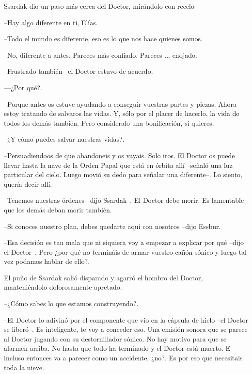 Ssardak dio un paso más cerca del Doctor, mirándolo con recelo


--Hay algo diferente en ti, Elías.



--Todo el mundo es diferente, eso es lo que nos hace quienes somos.



--No, diferente a antes. Pareces más confiado. Pareces ... enojado.



--Frustrado también --el Doctor estuvo de acuerdo.



—¿Por qué?.



--Porque antes os estuve ayudando a conseguir vuestras partes y piezas. Ahora estoy tratando de salvaros las vidas. Y, sólo por el placer de hacerlo, la vida de todos los demás también. Pero consideralo una bonificación, si quieres.



--¿Y cómo puedes salvar nuestras vidas?.



--Persuadiendoos de que abandoneis y os vayais. Solo iros. El Doctor os puede llevar hasta la nave de la Orden Papal que está en órbita allí --señaló una luz particular del cielo. Luego movió su dedo para señalar una diferente--. Lo siento, quería decir allí.



--Tenemos nuestras órdenes --dijo Ssardak--. El Doctor debe morir. Es lamentable que los demás deban morir también.



--Si conoces nuestro plan, debes quedarte aquí con nosotros --dijo Essbur.



--Esa decisión es tan mala que ni siquiera voy a empezar a explicar por qué --dijo el Doctor--.  Pero ¿por qué no termináis de armar vuestro cañón sónico y luego tal vez podamos hablar de ello?. 



El puño de Ssardak salió disparado y agarró el hombro del Doctor, manteniéndolo dolorosamente apretado.

--¿Cómo sabes lo que estamos construyendo?.



--El Doctor lo adivinó por el componente que vio en la cápsula de hielo --el Doctor se liberó--. Es inteligente, te voy a conceder eso. Una emisión sonora que se parece al Doctor jugando con su destornillador sónico. No hay motivo para que se alarmen arriba. No hasta que todo ha terminado y el Doctor está muerto. E incluso entonces va a parecer como un accidente, ¿no?. Es por eso que necesitais toda la nieve. 



